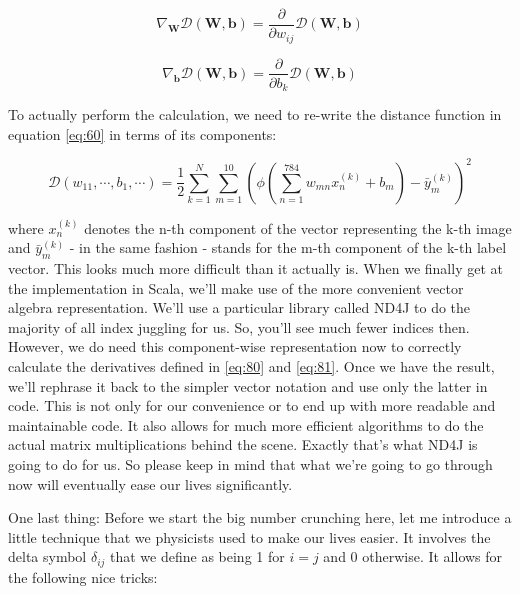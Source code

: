 \documentclass[]{report}
\begin{document}
\begin{equation}\label{eq:80}
	\nabla_{\mathbf{W}} \mathcal{D}( \mathbf{W}, \mathbf{b})= \frac{\partial}{\partial w_{ij}}  \mathcal{D}( \mathbf{W}, \mathbf{b})
\end{equation}

\begin{equation}\label{eq:81}
	\nabla_{\mathbf{b}} \mathcal{D}( \mathbf{W}, \mathbf{b}) = \frac{\partial}{\partial b_k} \mathcal{D}( \mathbf{W}, \mathbf{b})
\end{equation}

To actually perform the calculation, we need to re-write the distance function in equation \ref{eq:60} in terms of its components:

\begin{equation}\label{eq:100}
\mathcal{D}(w_{11},\cdots, b_1, \cdots) = \frac{1}{2} \sum_{k=1}^N \sum_{m=1}^{10} ( \phi(\sum_{n=1}^{784} w_{mn} x^{(k)}_n + b_m) - \bar{y}_m^{(k)})^2
\end{equation}

where \(x^{(k)}_n \) denotes the n-th component of the vector representing the k-th image and \(\bar{y}_m^{(k)}\) - in the same fashion - stands for the m-th component of the k-th label vector.
This looks much more difficult than it actually is. When we finally get at the implementation in Scala, we'll make use of the more convenient vector algebra representation. We'll use a particular library called ND4J to do the majority of all index juggling for us. So, you'll see much fewer indices then. However, we do need this component-wise representation now to correctly calculate the derivatives defined in \ref{eq:80} and \ref{eq:81}. Once we have the result, we'll rephrase it back to the simpler vector notation and use only the latter in code. This is not only for our convenience or to end up with more readable and maintainable code. It also allows for much more efficient algorithms to do the actual matrix multiplications behind the scene. Exactly  that's what ND4J is going to do for us. So please keep in mind that what we're going to go through now will eventually ease our lives significantly.

\bigskip

One last thing: Before we start the big number crunching here, let me introduce a little technique that we physicists used to make our lives easier. It involves the delta symbol \(\delta_{ij}\) that we define as being 1 for \(i=j \) and 0 otherwise. It allows for the following nice tricks:
\end{document}
